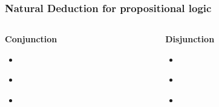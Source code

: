 \documentclass{beamer}
\begin{document}
\begin{frame}
  \frametitle{Natural Deduction for propositional logic}

  \begin{columns}
    
    \begin{column}{.3\textwidth}
      \textbf{\quad Conjunction}
      \minipage[c][0.6\textheight][s]{\columnwidth}
      \vspace{0.05\textheight}
      \begin{itemize}
      \item
        \begin{prooftree}
        \end{prooftree}
      \item
        \begin{prooftree}
        \end{prooftree}
      \item
        \begin{prooftree}
        \end{prooftree}
      \end{itemize}
      \endminipage
    \end{column}

    \begin{column}{.6\textwidth}
      \textbf{\qquad Disjunction}
      \minipage[c][0.6\textheight][s]{\columnwidth}
      \vspace{0.05\textheight}
      \begin{itemize}
      \item
        \begin{prooftree}
        \end{prooftree}

      \item
        \begin{prooftree}
        \end{prooftree}

      \item
        \begin{prooftree}
        \end{prooftree}
      \end{itemize}
      \endminipage
    \end{column}

  \end{columns}
\end{frame}
\end{document}
